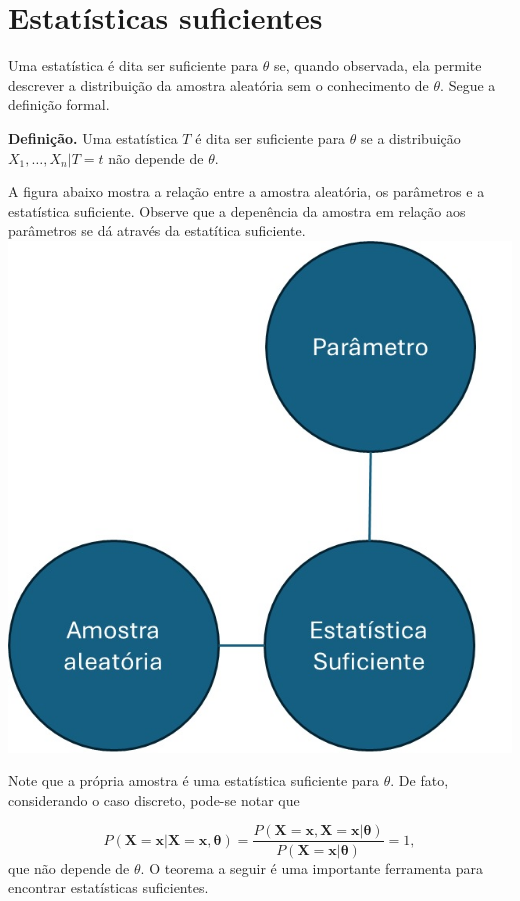 \documentclass[
  letterpaper,
  DIV=11,
  numbers=noendperiod]{scrartcl}
\begin{document}
\section{Estatísticas suficientes}\label{estatuxedsticas-suficientes}

Uma estatística é dita ser suficiente para \(\theta\) se, quando
observada, ela permite descrever a distribuição da amostra aleatória sem
o conhecimento de \(\theta\). Segue a definição formal.

\textbf{Definição.} Uma estatística \(T\) é dita ser suficiente para
\(\theta\) se a distribuição \(X_1,\ldots,X_n|T=t\) não depende de
\(\theta\).

A figura abaixo mostra a relação entre a amostra aleatória, os
parâmetros e a estatística suficiente. Observe que a depenência da
amostra em relação aos parâmetros se dá através da estatítica
suficiente. \includegraphics{fig_stat_suficiente.jpg}

Note que a própria amostra é uma estatística suficiente para \(\theta\).
De fato, considerando o caso discreto, pode-se notar que

\[P(\textbf{X}=\textbf{x}|\textbf{X}=\textbf{x},\boldsymbol{\theta})=\frac{P(\textbf{X}=\textbf{x},\textbf{X}=\textbf{x}|\boldsymbol{\theta})}{P(\textbf{X}=\textbf{x}|\boldsymbol{\theta})}=1,\]
que não depende de \(\theta\). O teorema a seguir é uma importante
ferramenta para encontrar estatísticas suficientes.
\end{document}
